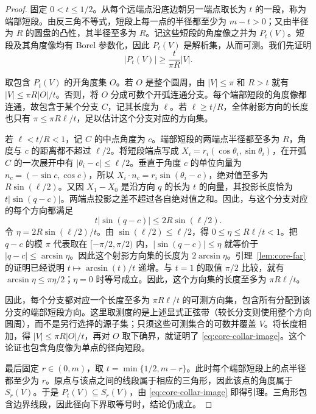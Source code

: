 \begin{proof}
固定 $0<t\leq1/2$。从每个远端点沿底边朝另一端点取长为 $t$ 的一段，称为端部短段。由反三角不等式，短段上每一点的半径都至少为 $m-t>0$；又由半径为 $R$ 的圆盘的凸性，其半径至多为 $R$。记这些短段的角度像之并为 $P_t(V)$。短段及其角度像均有 Borel 参数化，因此 $P_t(V)$ 是解析集，从而可测。我们先证明
\begin{equation}
                        |P_t(V)|\geq\frac{t}{\pi R}|V|.
\label{eq:core-collar-image}
\end{equation}

取包含 $P_t(V)$ 的开角度集 $O$。若 $O$ 是整个圆周，由 $|V|\leq\pi$ 和 $R>t$ 就有 $|V|\leq\pi R|O|/t$。否则，将 $O$ 分成可数个开弧连通分支。每个端部短段的角度像都连通，故包含于某个分支 $C$，记其长度为 $\ell$。若 $\ell\geq t/R$，全体射影方向的长度也只有 $\pi\leq\pi R\ell/t$，足以估计这个分支对应的方向集。

若 $\ell<t/R<1$，记 $C$ 的中点角度为 $c$。端部短段的两端点半径都至多为 $R$，角度与 $c$ 的距离都不超过 $\ell/2$。将短段端点写成 $X_i=r_i(\cos\theta_i,\sin\theta_i)$，在开弧 $C$ 的一次展开中有 $|\theta_i-c|\leq\ell/2$。垂直于角度 $c$ 的单位向量为 $n_c=(-\sin c,\cos c)$，所以 $X_i\cdot n_c=r_i\sin(\theta_i-c)$，绝对值至多为 $R\sin(\ell/2)$。又因 $X_1-X_0$ 是沿方向 $q$ 的长为 $t$ 的向量，其投影长度恰为 $t|\sin(q-c)|$。两端点投影之差不超过各自绝对值之和。因此，与这个分支对应的每个方向都满足
\[
                  t|\sin(q-c)|\leq2R\sin(\ell/2).
\]
令 $\eta=2R\sin(\ell/2)/t$。由 $\sin(\ell/2)\leq\ell/2$，得 $0\leq\eta\leq R\ell/t<1$。把 $q-c$ 的模 $\pi$ 代表取在 $[-\pi/2,\pi/2)$ 内，$|\sin(q-c)|\leq\eta$ 就等价于 $|q-c|\leq\arcsin\eta$。因此这个射影方向集的长度为 $2\arcsin\eta$。引理~\ref{lem:core-far} 的证明已经说明 $t\mapsto\arcsin(t)/t$ 递增。与 $t=1$ 的取值 $\pi/2$ 比较，就有 $\arcsin\eta\leq\pi\eta/2$；$\eta=0$ 时等号成立。因此，这个方向集的长度至多为 $\pi R\ell/t$。

因此，每个分支都对应一个长度至多为 $\pi R\ell/t$ 的可测方向集，包含所有分配到该分支的端部短段方向。这里取测度的是上述显式正弦带（较长分支则使用整个方向圆周），而不是另行选择的源子集；只须这些可测集合的可数并覆盖 $V$。将长度相加，得 $|V|\leq\pi R|O|/t$，再对 $O$ 取下确界，就证明了 \eqref{eq:core-collar-image}。这个论证也包含角度像为单点的径向短段。

最后固定 $r\in(0,m)$，取 $t=\min\{1/2,m-r\}$。此时每个端部短段上的点半径都至少为 $r$。原点与该点之间的线段属于相应的三角形，因此该点的角度属于 $S_r(V)$。于是 $P_t(V)\subseteq S_r(V)$，由 \eqref{eq:core-collar-image} 即得引理。三角形包含边界线段，因此径向下界取等号时，结论仍成立。
\end{proof}

